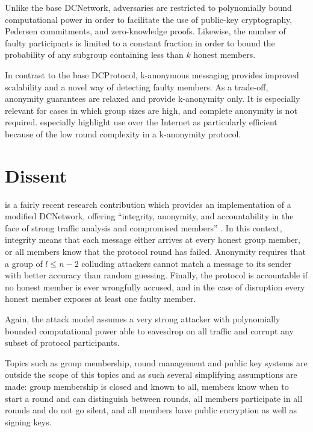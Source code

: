 Unlike the base \ac{DCNetwork}, adversaries are restricted to polynomially bound computational
power in order to facilitate the use of public-key cryptography, Pedersen commitments, and zero-knowledge
proofs. Likewise, the number of faulty participants is limited to a constant fraction in order
to bound the probability of any subgroup containing less than $k$ honest members.

In contrast to the base \ac{DCProtocol}, k-anonymous messaging provides improved scalability and
a novel way of detecting faulty members. As a trade-off, anonymity guarantees are relaxed
and provide k-anonymity only. It is especially relevant for cases in which group sizes are high,
and complete anonymity is not required. \citeauthor{von2003k} especially highlight use over the
Internet as particularly efficient because of the low round complexity in a k-anonymity protocol.

\section{Dissent} \label{sec:dissent}

\Dissent is a fairly recent research contribution which provides an implementation of a modified \ac{DCNetwork},
offering ``integrity, anonymity, and accountability in the face of strong traffic analysis and compromised members'' \cite{journals/corr/abs-1004-3057}. In this context, integrity means that each message either
arrives at every honest group member, or all members know that the protocol round has failed. Anonymity
requires that a group of $l \leq n - 2$ colluding attackers cannot match a message to its sender
with better accuracy than random guessing. Finally, the protocol is accountable if no honest member is
ever wrongfully accused, and in the case of disruption every honest member exposes at least one faulty member.

Again, the attack model assumes a very strong attacker with polynomially bounded computational
power able to eavesdrop on all traffic and corrupt any subset of protocol participants.

Topics such as group membership, round management and public key systems are outside
the scope of this topics and as such several simplifying assumptions are made: group membership is closed
and known to all, members
know when to start a round and can distinguish between rounds, all members participate in all rounds
and do not go silent, and all members have public encryption as well as signing keys.

